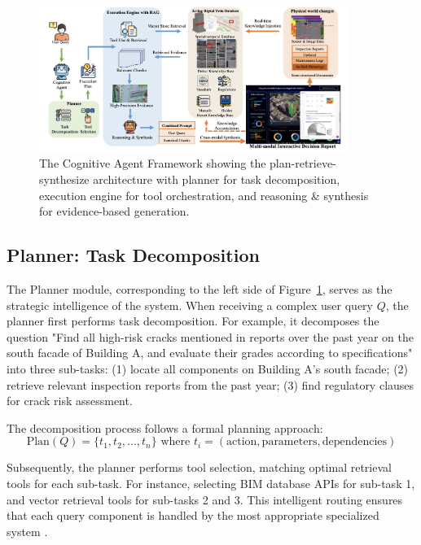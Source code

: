 \begin{figure}[htbp]
\centering
\includegraphics[width=0.9\textwidth]{figures/DefectGPT/The Cognitive Agent Framework.png}
\caption{The Cognitive Agent Framework showing the plan-retrieve-synthesize architecture with planner for task decomposition, execution engine for tool orchestration, and reasoning \& synthesis for evidence-based generation.}
\label{fig:cognitive-agent-framework}
\end{figure}

\subsection{Planner: Task Decomposition}

The Planner module, corresponding to the left side of Figure~\ref{fig:cognitive-agent-framework}, serves as the strategic intelligence of the system. When receiving a complex user query $Q$, the planner first performs task decomposition. For example, it decomposes the question "Find all high-risk cracks mentioned in reports over the past year on the south facade of Building A, and evaluate their grades according to specifications" into three sub-tasks: (1) locate all components on Building A's south facade; (2) retrieve relevant inspection reports from the past year; (3) find regulatory clauses for crack risk assessment.

The decomposition process follows a formal planning approach:
\begin{equation}
\text{Plan}(Q) = \{t_1, t_2, ..., t_n\} \text{ where } t_i = (\text{action}, \text{parameters}, \text{dependencies})
\end{equation}

Subsequently, the planner performs tool selection, matching optimal retrieval tools for each sub-task. For instance, selecting BIM database APIs for sub-task 1, and vector retrieval tools for sub-tasks 2 and 3. This intelligent routing ensures that each query component is handled by the most appropriate specialized system \cite{yao2022react}.

